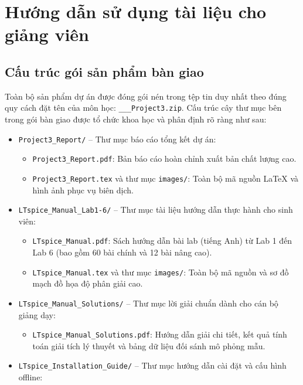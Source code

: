 \documentclass[12pt,a4paper]{article}
\begin{document}
\section{Hướng dẫn sử dụng tài liệu cho giảng viên}

\subsection{Cấu trúc gói sản phẩm bàn giao}
Toàn bộ sản phẩm dự án được đóng gói nén trong tệp tin duy nhất theo đúng quy cách đặt tên của môn học: \texttt{\MSa\_\MSb\_\MSc\_Project3.zip}. Cấu trúc cây thư mục bên trong gói bàn giao được tổ chức khoa học và phân định rõ ràng như sau:
\begin{itemize}[itemsep=2pt]
  \item \texttt{Project3\_Report/} -- Thư mục báo cáo tổng kết dự án:
    \begin{itemize}[itemsep=1pt]
      \item \texttt{Project3\_Report.pdf}: Bản báo cáo hoàn chỉnh xuất bản chất lượng cao.
      \item \texttt{Project3\_Report.tex} và thư mục \texttt{images/}: Toàn bộ mã nguồn LaTeX và hình ảnh phục vụ biên dịch.
    \end{itemize}
  \item \texttt{LTspice\_Manual\_Lab1-6/} -- Thư mục tài liệu hướng dẫn thực hành cho sinh viên:
    \begin{itemize}[itemsep=1pt]
      \item \texttt{LTspice\_Manual.pdf}: Sách hướng dẫn bài lab (tiếng Anh) từ Lab 1 đến Lab 6 (bao gồm 60 bài chính và 12 bài nâng cao).
      \item \texttt{LTspice\_Manual.tex} và thư mục \texttt{images/}: Toàn bộ mã nguồn và sơ đồ mạch đồ họa độ phân giải cao.
    \end{itemize}
  \item \texttt{LTspice\_Manual\_Solutions/} -- Thư mục lời giải chuẩn dành cho cán bộ giảng dạy:
    \begin{itemize}[itemsep=1pt]
      \item \texttt{LTspice\_Manual\_Solutions.pdf}: Hướng dẫn giải chi tiết, kết quả tính toán giải tích lý thuyết và bảng dữ liệu đối sánh mô phỏng mẫu.
    \end{itemize}
  \item \texttt{LTspice\_Installation\_Guide/} -- Thư mục hướng dẫn cài đặt và cấu hình offline:
    \begin{itemize}[itemsep=1pt]

\end{itemize}
\end{itemize}
\end{document}
